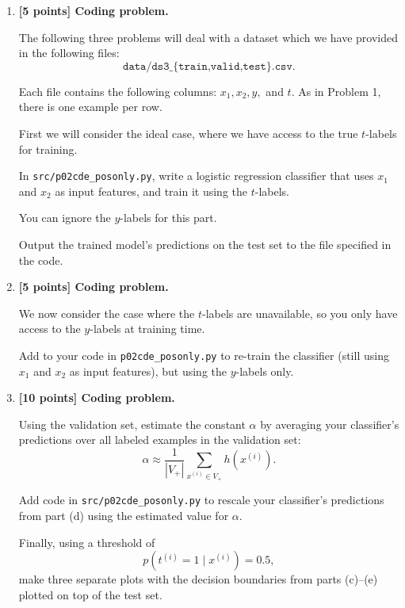 \documentclass[10pt]{article}
\begin{document}
\begin{enumerate}
\begin{enumerate}[label=(\alph*)]
\item \textbf{[5 points] Coding problem.}

The following three problems will deal with a dataset which we have
provided in the following files:
\[
\texttt{data/ds3\_\{train,valid,test\}.csv}.
\]

Each file contains the following columns:
$x_1,x_2,y,$ and $t$.
As in Problem 1, there is one example per row.

First we will consider the ideal case, where we have access to the
true $t$-labels for training.

In \texttt{src/p02cde\_posonly.py}, write a logistic regression
classifier that uses $x_1$ and $x_2$ as input features, and train it
using the $t$-labels.

You can ignore the $y$-labels for this part.

Output the trained model's predictions on the test set to the file
specified in the code.


\item \textbf{[5 points] Coding problem.}

We now consider the case where the $t$-labels are unavailable, so you
only have access to the $y$-labels at training time.

Add to your code in \texttt{p02cde\_posonly.py} to re-train the
classifier (still using $x_1$ and $x_2$ as input features), but using
the $y$-labels only.


\item \textbf{[10 points] Coding problem.}

Using the validation set, estimate the constant $\alpha$ by averaging
your classifier's predictions over all labeled examples in the
validation set:
\[
\alpha
\approx
\frac{1}{|V_+|}
\sum_{x^{(i)}\in V_+}
h(x^{(i)}).
\]

Add code in \texttt{src/p02cde\_posonly.py} to rescale your
classifier's predictions from part (d) using the estimated value for
$\alpha$.

Finally, using a threshold of
\[
p(t^{(i)}=1\mid x^{(i)})=0.5,
\]
make three separate plots with the decision boundaries from parts
(c)--(e) plotted on top of the test set.


\end{enumerate}
\end{enumerate}
\end{document}
